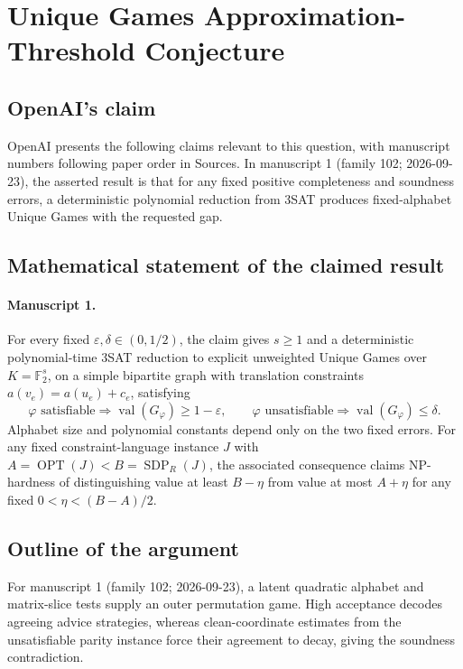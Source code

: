 \documentclass[11pt]{article}
\begin{document}
\section*{Unique Games Approximation-Threshold Conjecture}

\subsection{OpenAI's claim}
OpenAI presents the following claims relevant to this question, with manuscript numbers following paper order in Sources. In manuscript 1 (family 102; 2026-09-23), the asserted result is that for any fixed positive completeness and soundness errors, a deterministic polynomial reduction from 3SAT produces fixed-alphabet Unique Games with the requested gap.

\subsection{Mathematical statement of the claimed result}
\paragraph{Manuscript 1.}
For every fixed $\varepsilon,\delta\in(0,1/2)$, the claim gives $s\ge1$ and a deterministic polynomial-time $3$SAT reduction to explicit unweighted Unique Games over $K=\mathbb F_2^s$, on a simple bipartite graph with translation constraints $a(v_e)=a(u_e)+c_e$, satisfying
\[
 \varphi\text{ satisfiable}\Rightarrow\operatorname{val}(G_{\varphi})\ge1-\varepsilon,
 \qquad\varphi\text{ unsatisfiable}\Rightarrow\operatorname{val}(G_{\varphi})\le\delta.
\]
Alphabet size and polynomial constants depend only on the two fixed errors. For any fixed constraint-language instance $J$ with $A=\operatorname{OPT}(J)<B=\operatorname{SDP}_{R}(J)$, the associated consequence claims NP-hardness of distinguishing value at least $B-\eta$ from value at most $A+\eta$ for any fixed $0<\eta<(B-A)/2$.

\subsection{Outline of the argument}
For manuscript 1 (family 102; 2026-09-23), a latent quadratic alphabet and matrix-slice tests supply an outer permutation game. High acceptance decodes agreeing advice strategies, whereas clean-coordinate estimates from the unsatisfiable parity instance force their agreement to decay, giving the soundness contradiction.
\end{document}
